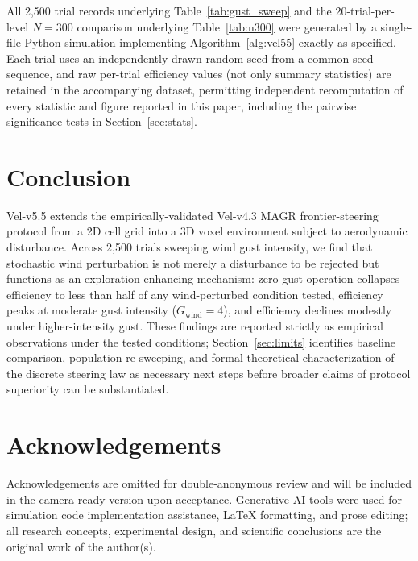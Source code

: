 \documentclass[10pt,journal]{IEEEtran}
\begin{document}
All 2{,}500 trial records underlying Table~\ref{tab:gust_sweep} and the
20-trial-per-level $N=300$ comparison underlying Table~\ref{tab:n300} were
generated by a single-file Python simulation implementing
Algorithm~\ref{alg:vel55} exactly as specified. Each trial uses an
independently-drawn random seed from a common seed sequence, and raw
per-trial efficiency values (not only summary statistics) are retained in
the accompanying dataset, permitting independent recomputation of every
statistic and figure reported in this paper, including the pairwise
significance tests in Section~\ref{sec:stats}.

\section{Conclusion}
\label{sec:conclusion}

Vel-v5.5 extends the empirically-validated Vel-v4.3 MAGR frontier-steering
protocol from a 2D cell grid into a 3D voxel environment subject to
aerodynamic disturbance. Across 2{,}500 trials sweeping wind gust
intensity, we find that stochastic wind perturbation is not merely a
disturbance to be rejected but functions as an exploration-enhancing
mechanism: zero-gust operation collapses efficiency to less than half of
any wind-perturbed condition tested, efficiency peaks at moderate gust
intensity ($G_{\text{wind}}=4$), and efficiency declines modestly under
higher-intensity gust. These findings are reported strictly as empirical
observations under the tested conditions; Section~\ref{sec:limits}
identifies baseline comparison, population re-sweeping, and formal
theoretical characterization of the discrete steering law as necessary next
steps before broader claims of protocol superiority can be substantiated.

\section*{Acknowledgements}
Acknowledgements are omitted for double-anonymous review and will be
included in the camera-ready version upon acceptance. Generative AI tools
were used for simulation code implementation assistance, LaTeX formatting,
and prose editing; all research concepts, experimental design, and
scientific conclusions are the original work of the author(s).
\end{document}
